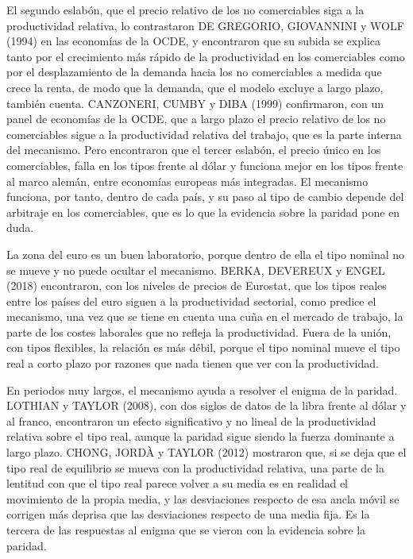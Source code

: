 \documentclass[10pt,a4paper]{article}
\begin{document}
El segundo eslabón, que el precio relativo de los no comerciables siga a la productividad relativa, lo contrastaron DE GREGORIO, GIOVANNINI y WOLF (1994) en las economías de la OCDE, y encontraron que su subida se explica tanto por el crecimiento más rápido de la productividad en los comerciables como por el desplazamiento de la demanda hacia los no comerciables a medida que crece la renta, de modo que la demanda, que el modelo excluye a largo plazo, también cuenta. CANZONERI, CUMBY y DIBA (1999) confirmaron, con un panel de economías de la OCDE, que a largo plazo el precio relativo de los no comerciables sigue a la productividad relativa del trabajo, que es la parte interna del mecanismo. Pero encontraron que el tercer eslabón, el precio único en los comerciables, falla en los tipos frente al dólar y funciona mejor en los tipos frente al marco alemán, entre economías europeas más integradas. El mecanismo funciona, por tanto, dentro de cada país, y su paso al tipo de cambio depende del arbitraje en los comerciables, que es lo que la evidencia sobre la paridad pone en duda.

La zona del euro es un buen laboratorio, porque dentro de ella el tipo nominal no se mueve y no puede ocultar el mecanismo. BERKA, DEVEREUX y ENGEL (2018) encontraron, con los niveles de precios de Eurostat, que los tipos reales entre los países del euro siguen a la productividad sectorial, como predice el mecanismo, una vez que se tiene en cuenta una cuña en el mercado de trabajo, la parte de los costes laborales que no refleja la productividad. Fuera de la unión, con tipos flexibles, la relación es más débil, porque el tipo nominal mueve el tipo real a corto plazo por razones que nada tienen que ver con la productividad.

En periodos muy largos, el mecanismo ayuda a resolver el enigma de la paridad. LOTHIAN y TAYLOR (2008), con dos siglos de datos de la libra frente al dólar y al franco, encontraron un efecto significativo y no lineal de la productividad relativa sobre el tipo real, aunque la paridad sigue siendo la fuerza dominante a largo plazo. CHONG, JORDÀ y TAYLOR (2012) mostraron que, si se deja que el tipo real de equilibrio se mueva con la productividad relativa, una parte de la lentitud con que el tipo real parece volver a su media es en realidad el movimiento de la propia media, y las desviaciones respecto de esa ancla móvil se corrigen más deprisa que las desviaciones respecto de una media fija. Es la tercera de las respuestas al enigma que se vieron con la evidencia sobre la paridad.
\end{document}
